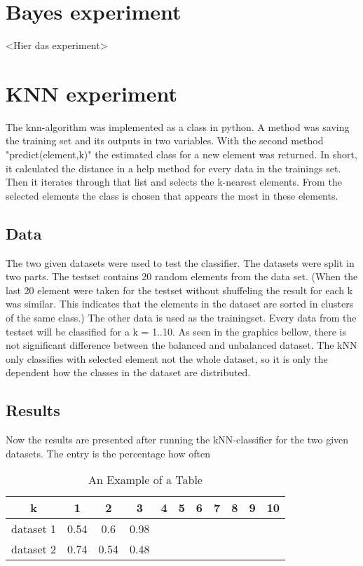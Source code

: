 \documentclass[a4paper,12pt]{article}
\newcommand{\initials}[1]{\marginpar{\quad\texttt{#1}}}
\begin{document}
\section{Bayes experiment}
<Hier das experiment>
\section{KNN experiment}
The knn-algorithm was implemented as a class in python. A method was saving the training set and its outputs in two variables. With the second method "predict(element,k)" the estimated class for a new element was returned. In short, it calculated the distance in a help method for every data in the trainings set. Then it iterates through that list and selects the k-nearest elements. From the selected elements the class is chosen that appears the most in these elements.

\initials{MA}
\subsection{Data}
The two given datasets were used to test the classifier. The datasets were split in two parts. The testset contains 20 random elements from the data set. (When the last 20 element were taken for the testset without shuffeling the result for each k was similar. This indicates that the elements in the dataset are sorted in clusters of the same class.) The other data is used as the trainingset. Every data from the testset will be classified for a k = 1..10. As seen in the graphics bellow, there is not significant difference between the balanced and unbalanced dataset. The kNN only classifies with selected element not the whole dataset, so it is only the dependent how the classes in the dataset are distributed.

\initials{MA}
\subsection{Results}
Now the results are presented after running the kNN-classifier for the two given datasets. The entry is the percentage how often
\begin{table}[h]
\caption{An Example of a Table}
\label{tab_example}
\centering
\begin{tabular}{c||c|c|c|c|c|c|c|c|c|c}
k & 1 & 2& 3 &4&5&6&7&8&9&10\\
\hline\hline
dataset 1 &0.54 & 0.6& 0.98\\
\hline
dataset 2 &0.74 & 0.54& 0.48\\

\end{tabular}
\end{table}
\initials{MA}
\end{document}
